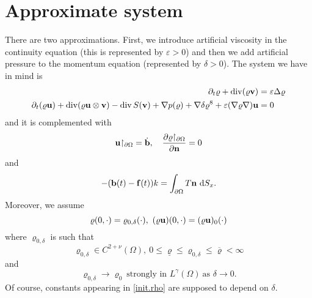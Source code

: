 \documentclass{article}
\DeclareMathOperator{\diver}{div}
\newcommand{\bb}{{\bf b}}
\newcommand{\vb}{\bb}
\newcommand{\vf}{{\bf f}}
\newcommand{\bn}{{\bf n}}
\newcommand{\vn}{\bn}
\newcommand{\bu}{{\bf u}}
\newcommand{\vu}{\bu}
\newcommand{\bv}{{\bf v}}
\newcommand{\vv}{\bv}
\newcommand{\pat}{\partial_t}
\numberwithin{equation}{section}
\begin{document}
\section{Approximate system} \label{app.system}

There are two approximations. First, we introduce artificial viscosity in the continuity equation (this is represented by $\varepsilon>0$) and then we add artificial pressure to the momentum equation (represented by $\delta>0$). The system we have in mind is
\begin{equation}
\begin{split}\label{eq.app.sys}
\pat \varrho + \diver(\varrho\vv) &= \varepsilon\Delta\varrho\\
\pat(\varrho\vu) + \diver (\varrho \vu\otimes\vv) - \diver S(\vv) + \nabla p(\varrho) +  \nabla\delta \varrho^8 + \varepsilon (\nabla \varrho \nabla)\vu &= 0
\end{split}
\end{equation}
and it is complemented with 
\begin{equation}\label{eq.bound.app}
\vu{\restriction_{\partial\Omega}} = \dot\vb,\quad \frac{\partial\varrho{\restriction_{\partial\Omega}}}{\partial \vn} = 0
\end{equation}
and
\begin{equation}\label{eq.newton.app}
-(\vb(t) - \vf(t))k = \int_{\partial\Omega} T\vn \ {\rm d}S_x.
\end{equation}
Moreover, we assume
$$
\varrho(0,\cdot) = \varrho_{0,\delta}(\cdot),\ (\varrho \vu)(0,\cdot) = (\varrho\vu)_{0}(\cdot)
$$ 
where $\varrho_{0,\delta}$  is such that
\begin{equation}
\varrho_{0,\delta}\in C^{2+\nu}(\Omega),\  0\leq \underline\varrho\leq \varrho_{0,\delta}\leq \overline\varrho<\infty \label{init.rho}
\end{equation}
and
$$
\varrho_{0,\delta}\to \varrho_0\ \mbox{strongly in }L^\gamma(\Omega)\ \mbox{as }\delta\to 0.
$$
Of course, constants appearing in \eqref{init.rho} are supposed to depend on $\delta$. 
\end{document}
